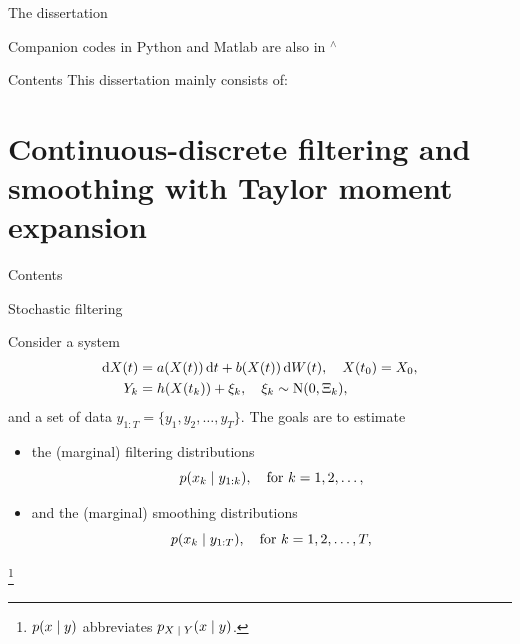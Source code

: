 \documentclass[seriffont, cmap=Beijing, 10pt]{zz}
\newcommand\blfootnote[1]{%
	\begingroup
	\renewcommand\thefootnote{}\footnote{\scriptsize#1}%
	\addtocounter{footnote}{-1}%
	\endgroup
}
\begin{document}
\begin{frame}{The dissertation}
\begin{minipage}{.48\textwidth}
\begin{block}{}
\begin{figure}
			\end{figure}
		\end{block}
		\begin{block}{}
			Companion codes in Python and Matlab are also in $^\wedge$
		\end{block}
	\end{minipage}
\end{frame}

\begin{frame}{Contents}
	This dissertation mainly consists of:
	\begin{block}{}
		\tableofcontents
	\end{block}
\end{frame}

\section{Continuous-discrete filtering and smoothing with Taylor moment expansion}
\begin{frame}{Contents}
	\begin{block}{}
		\tableofcontents[currentsection]
	\end{block}
\end{frame}

\begin{frame}{Stochastic filtering}
	\begin{block}{}
		Consider a system
		\begin{equation}
			\begin{split}
				\mathop{}\!\mathrm{d} X(t) &= a(X(t)) \mathop{}\!\mathrm{d} t + b(X(t)) \mathop{}\!\mathrm{d} W(t), \quad X(t_0) = X_0,\\
				Y_k &= h(X(t_k)) + \xi_k, \quad \xi_k \sim \mathrm{N}(0, \Xi_k),
			\end{split}
		\end{equation}
		and a set of data $y_{1:T} = \lbrace y_1, y_2,\ldots, y_T \rbrace$. The goals are to estimate
		\begin{itemize}
			\item the (marginal) \alert{filtering} distributions
			\begin{equation}
				p(x_k {\;|\;} y_{1:k}), \quad \text{for }k=1,2,\ldots,
			\end{equation}
			\item and the (marginal) \alert{smoothing} distributions
			\begin{equation}
				p(x_k {\;|\;} y_{1:T}), \quad \text{for }k=1,2,\ldots,T,
			\end{equation}
		\end{itemize}
	\end{block}
	\blfootnote{$p(x {\;|\;} y)$ abbreviates $p_{X {\;|\;} Y}(x {\;|\;} y)$.}
\end{frame}
\end{document}
